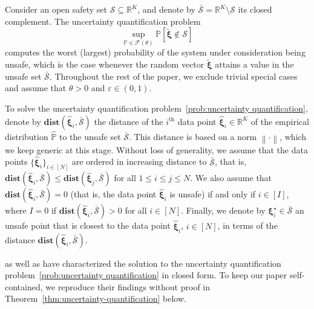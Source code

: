 \documentclass[nonblindrev]{informs2017}
\newcommand{\bmt}[1]{\tilde{\bm{#1}}}
\newcommand{\bmh}[1]{\hat{\bm{#1}}}
\newcommand{\1}[1]{\mathds{1}{\left(#1\right)}}
\begin{document}
Consider an open safety set $\mathcal{S} \subseteq \mathbb{R}^K $, and denote by $\bar{\mathcal{S}} = \mathbb{R}^K \setminus \mathcal{S}$ its closed complement. The uncertainty quantification problem 
\begin{equation}
\label{prob:uncertainty quantification}
\sup_{\mathbb{P} \in \mathcal{F}(\theta)} \mathbb{P}[\bmt{\xi} \notin \mathcal{S}]
\end{equation}
computes the worst (largest) probability of the system under consideration being unsafe, which is the case whenever the random vector $\bmt{\xi}$ attains a value in the unsafe set $\bar{\mathcal{S}}$. Throughout the rest of the paper, we exclude trivial special cases and assume that $\theta > 0$ and $\varepsilon \in (0, 1)$.

To solve the uncertainty quantification problem~\eqref{prob:uncertainty quantification}, denote by $\mathbf{dist}(\bmh{\xi}_i, \bar{\mathcal{S}})$ the distance of the $i^\text{th}$ data point $\bmh{\xi}_i \in \mathbb{R}^K$ of the empirical distribution $\hat{\mathbb{P}}$ to the unsafe set $\bar{\mathcal{S}}$. This distance is based on a norm $\left \lVert \cdot \right \rVert$, which we keep generic at this stage. Without loss of generality, we assume that the data points $\{\bmh{\xi}_i\}_{i \in [N]} $ are ordered in increasing distance to $\bar{\mathcal{S}}$, that is, $\mathbf{dist}(\bmh{\xi}_i, \bar{\mathcal{S}}) \leq \mathbf{dist}(\bmh{\xi}_j, \bar{\mathcal{S}})$ for all $1 \leq i \leq j \leq N$. We also assume that $\mathbf{dist}(\bmh{\xi}_i, \bar{\mathcal{S}}) = 0$ (that is, the data point $\bmh{\xi}_i$ is unsafe) if and only if $i \in [I]$, where $I = 0$ if $\mathbf{dist}(\bmh{\xi}_i, \bar{\mathcal{S}}) > 0$ for all $i \in [N]$. Finally, we denote by $\bm{\xi}^\star_i \in \bar{\mathcal{S}}$ an unsafe point that is closest to the data point $\bmh{\xi}_i$, $i \in [N]$, in terms of the distance $\mathbf{dist} (\bmh{\xi}_i, \bar{\mathcal{S}})$.

\cite{blanchet2016quantifying} as well as \cite{Gao_Kleywegt_2016} have characterized the solution to the uncertainty quantification problem~\eqref{prob:uncertainty quantification} in closed form. To keep our paper self-contained, we reproduce their findings without proof in Theorem~\ref{thm:uncertainty-quantification} below.
\end{document}
